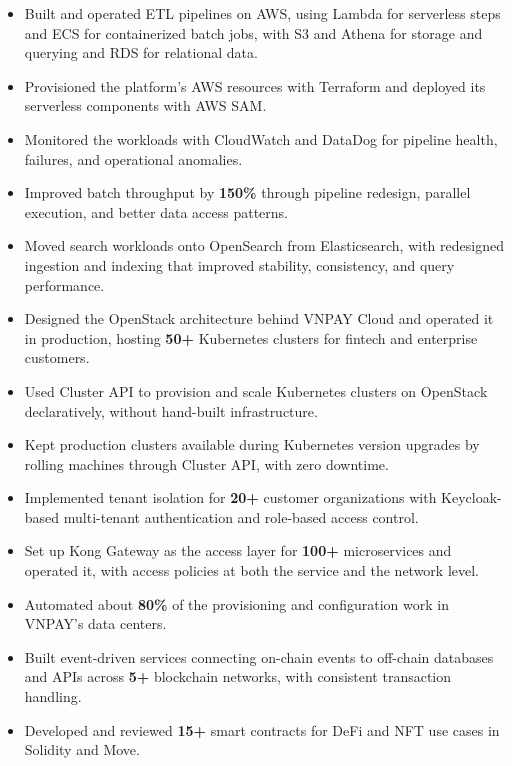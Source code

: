\begin{itemize}
    \item Built and operated ETL pipelines on AWS, using Lambda for serverless steps and ECS for containerized batch jobs, with S3 and Athena for storage and querying and RDS for relational data. %
    \item Provisioned the platform's AWS resources with Terraform and deployed its serverless components with AWS SAM. %
    \item Monitored the workloads with CloudWatch and DataDog for pipeline health, failures, and operational anomalies. %
    \item Improved batch throughput by \textbf{150\%} through pipeline redesign, parallel execution, and better data access patterns. %
    \item Moved search workloads onto OpenSearch from Elasticsearch, with redesigned ingestion and indexing that improved stability, consistency, and query performance. %
\end{itemize}

\begin{itemize}
    \item Designed the OpenStack architecture behind VNPAY Cloud and operated it in production, hosting \textbf{50+} Kubernetes clusters for fintech and enterprise customers. %
    \item Used Cluster API to provision and scale Kubernetes clusters on OpenStack declaratively, without hand-built infrastructure. %
    \item Kept production clusters available during Kubernetes version upgrades by rolling machines through Cluster API, with zero downtime. %
    \item Implemented tenant isolation for \textbf{20+} customer organizations with Keycloak-based multi-tenant authentication and role-based access control. %
    \item Set up Kong Gateway as the access layer for \textbf{100+} microservices and operated it, with access policies at both the service and the network level. %
    \item Automated about \textbf{80\%} of the provisioning and configuration work in VNPAY's data centers. %
\end{itemize}

\jobEsolLabs
\begin{itemize}
    \item Built event-driven services connecting on-chain events to off-chain databases and APIs across \textbf{5+} blockchain networks, with consistent transaction handling. %
    \item Developed and reviewed \textbf{15+} smart contracts for DeFi and NFT use cases in Solidity and Move. %
\end{itemize}

